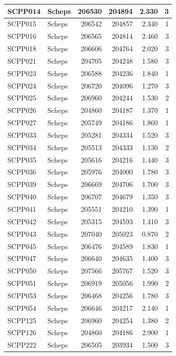 \documentclass[11pt,]{book}
\begin{document}
\begin{table}
\begin{tabular}[t]{l|l|r|r|r|r}
\hline
SCPP014 & Scheps & 206530 & 204894 & 2.330 & 3\\
\hline
SCPP015 & Scheps & 206542 & 204857 & 2.340 & 1\\
\hline
SCPP016 & Scheps & 206565 & 204814 & 2.460 & 3\\
\hline
SCPP018 & Scheps & 206606 & 204764 & 2.020 & 3\\
\hline
SCPP021 & Scheps & 204705 & 204248 & 1.580 & 3\\
\hline
SCPP023 & Scheps & 206588 & 204236 & 1.840 & 1\\
\hline
SCPP024 & Scheps & 206720 & 204096 & 1.270 & 3\\
\hline
SCPP025 & Scheps & 206960 & 204244 & 1.530 & 2\\
\hline
SCPP026 & Scheps & 204860 & 204187 & 1.370 & 1\\
\hline
SCPP027 & Scheps & 205749 & 204186 & 1.860 & 1\\
\hline
SCPP033 & Scheps & 205281 & 204334 & 1.520 & 3\\
\hline
SCPP034 & Scheps & 205513 & 204333 & 1.130 & 2\\
\hline
SCPP035 & Scheps & 205616 & 204216 & 1.440 & 3\\
\hline
SCPP036 & Scheps & 205976 & 204000 & 1.780 & 3\\
\hline
SCPP039 & Scheps & 206669 & 204706 & 1.700 & 3\\
\hline
SCPP040 & Scheps & 206707 & 204679 & 1.350 & 3\\
\hline
SCPP041 & Scheps & 205551 & 204210 & 1.390 & 1\\
\hline
SCPP042 & Scheps & 205315 & 204593 & 1.410 & 3\\
\hline
SCPP043 & Scheps & 207040 & 205023 & 0.870 & 2\\
\hline
SCPP045 & Scheps & 206476 & 204589 & 1.830 & 1\\
\hline
SCPP047 & Scheps & 206640 & 204635 & 1.400 & 3\\
\hline
SCPP050 & Scheps & 207566 & 205767 & 1.520 & 3\\
\hline
SCPP051 & Scheps & 206919 & 205056 & 1.990 & 2\\
\hline
SCPP053 & Scheps & 206468 & 204256 & 1.780 & 3\\
\hline
SCPP054 & Scheps & 206646 & 204217 & 2.140 & 1\\
\hline
SCPP125 & Scheps & 206960 & 204254 & 1.380 & 2\\
\hline
SCPP126 & Scheps & 204860 & 204186 & 2.900 & 1\\
\hline
SCPP222 & Scheps & 206505 & 203934 & 1.500 & 3\\

\end{tabular}
\end{table}
\end{document}
